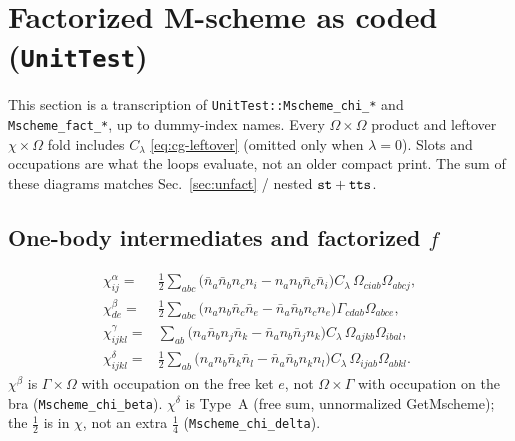 \documentclass[enabledeprecatedfontcommands]{scrartcl}
\newcommand{\codename}[1]{\texttt{#1}}
\begin{document}
\section{Factorized M-scheme as coded (\codename{UnitTest})}
\label{sec:fact}

This section is a transcription of
\codename{UnitTest::Mscheme\_chi\_*} and \codename{Mscheme\_fact\_*},
up to dummy-index names. Every $\Omega\times\Omega$ product and leftover
$\chi\times\Omega$ fold includes $C_\lambda$ \eqref{eq:cg-leftover}
(omitted only when $\lambda=0$).
Slots and occupations are what the loops evaluate, not an older compact
print. The sum of these diagrams matches Sec.~\ref{sec:unfact} / nested
${\tt st}+{\tt tts}$.

\subsection{One-body intermediates and factorized $f$}
\label{sec:fact1b}

\begin{subequations}\label{eq:chi1b}
\begin{align}
\chi^{\alpha}_{ij}
  =&\frac12\sum_{abc}
    \bigl(\bar n_a\bar n_b n_c n_i-n_a n_b\bar n_c\bar n_i\bigr)
    C_\lambda\,\Omega_{ciab}\Omega_{abcj},\\
\chi^{\beta}_{de}
  =&\frac12\sum_{abc}
    \bigl(n_a n_b\bar n_c\bar n_e-\bar n_a\bar n_b n_c n_e\bigr)
    \Gamma_{cdab}\Omega_{abce},
  \label{eq:chibeta}\\
\chi^{\gamma}_{ijkl}
  =&\sum_{ab}
    \bigl(n_a\bar n_b n_j\bar n_k-\bar n_a n_b\bar n_j n_k\bigr)
    C_\lambda\,\Omega_{ajkb}\Omega_{ibal},\\
\chi^{\delta}_{ijkl}
  =&\frac12\sum_{ab}
    \bigl(n_a n_b\bar n_k\bar n_l-\bar n_a\bar n_b n_k n_l\bigr)
    C_\lambda\,\Omega_{ijab}\Omega_{abkl}.
  \label{eq:chidelta}
\end{align}
\end{subequations}
$\chi^\beta$ is $\Gamma\times\Omega$ with occupation on the free ket $e$,
not $\Omega\times\Gamma$ with occupation on the bra
(\codename{Mscheme\_chi\_beta}).
$\chi^\delta$ is Type~A (free sum, unnormalized GetMscheme); the
$\tfrac12$ is in $\chi$, not an extra $\tfrac14$
(\codename{Mscheme\_chi\_delta}).
\end{document}
